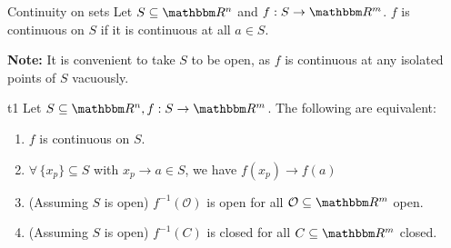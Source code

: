 \documentclass[Analysis-3]{subfiles}
\begin{document}
\begin{Def}{Continuity on sets}{}
  Let $ S \subseteq \R^n $ and $ f: S \to \R^m $. $ f $ is continuous on $ S $ if it is continuous at all $ a \in S $.
\end{Def}
\textbf{Note:} It is convenient to take $ S $ to be open, as $ f $ is continuous at any isolated points of $ S $ vacuously.
\pagebreak

\begin{Thm}{}{t1}
  Let $ S \subseteq \R^n, f: S \to \R^m $. The following are equivalent:
  \begin{enumerate}[label = (\arabic*)]
    \item $ f $ is continuous on $ S $.
    \item $ \forall \, \{x_p\} \subseteq S $ with $ x_p \longrightarrow a \in S $, we have $ f(x_p) \longrightarrow f(a) $
    \item (Assuming $ S $ is open) $ f^{-1}(\mathcal O) $ is open for all $ \mathcal O \subseteq \R^m $ open.
    \item (Assuming $ S $ is open) $ f^{-1}(C) $ is closed for all $ C \subseteq \R^m $ closed.
  \end{enumerate}
\end{Thm}
\end{document}
